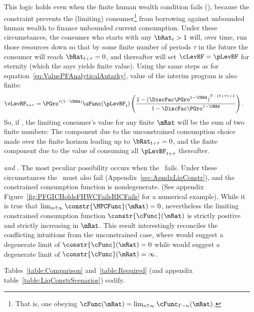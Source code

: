 \documentclass[BufferStockTheory]{subfiles}
\begin{document}
This logic holds even when the finite human wealth condition fails (\cncl{\FHWC}), because the constraint prevents the (limiting) consumer\footnote{That is, one obeying $\cFunc(\mRat) = \lim_{n \uparrow \infty} \cFunc_{T-n}(\mRat)$.} from borrowing against unbounded human wealth to finance unbounded current consumption.  Under these circumstances, the consumer who starts with any $\bRat_{t} > 1$ will, over time, run those resources down so that by some finite number of periods $\tau$ in the future the consumer will reach $\bRat_{t+\tau} = 0$, and thereafter will set $\cLevBF = \pLevBF$ for eternity (which the {\PFFVAC} says yields finite value).  Using the same steps as for equation~\eqref{eq:ValuePFAnalyticalAutarky}, value of the interim program is also finite: \hypertarget{PFFVAC}{} \hypertarget{PFVAF}{}
\begin{align*}
  \vLevBF_{t+\tau} %
 & = \PGro^{\tau(1-\CRRA)} \uFunc(\pLevBF_{t})\left(\frac{1-{(\DiscFac \PGro^{1-\CRRA})}^{T-(t+\tau)+1}}{1-\DiscFac \PGro^{1-\CRRA}}\right).
\end{align*}
So, if \cncl{\FHWC}, the limiting consumer's value for any finite $\mRat$ will be the sum of two finite numbers: The component due to the unconstrained consumption choice made over the finite horizon leading up to $\bRat_{t+\tau} = 0$, and the finite component due to the value of consuming all $\pLevBF_{t+\tau}$ thereafter.

\hypertarget{RICandFHWCFail}{} \textit{{\GICRaw} and {\cncl{\RIC}}}.  The most peculiar possibility occurs when the \RIC~fails.  Under these circumstances the \FHWC~must also fail (Appendix~\ref{sec:ApndxLiqConstr}), and the constrained consumption function is nondegenerate.  (See appendix Figure~\ref{fig:PFGICHoldsFHWCFailsRICFails} for a numerical example).  While it is true that $\lim_{m \uparrow \infty} \constr{\MPCFunc}(\mRat) = 0$, nevertheless the limiting constrained consumption function $\constr{\cFunc}(\mRat)$ is strictly positive and strictly increasing in $\mRat$.  This result interestingly reconciles the conflicting intuitions from the unconstrained case, where \cncl{\RIC} would suggest a degenerate limit of $\constr{\cFunc}(\mRat)=0$ while \cncl{\FHWC} would suggest a degenerate limit of $\constr{\cFunc}(\mRat)=\infty$.

Tables~\ref{table:Comparison} and~\ref{table:Required} (and appendix table~\ref{table:LiqConstrScenarios}) codify.
\end{document}
